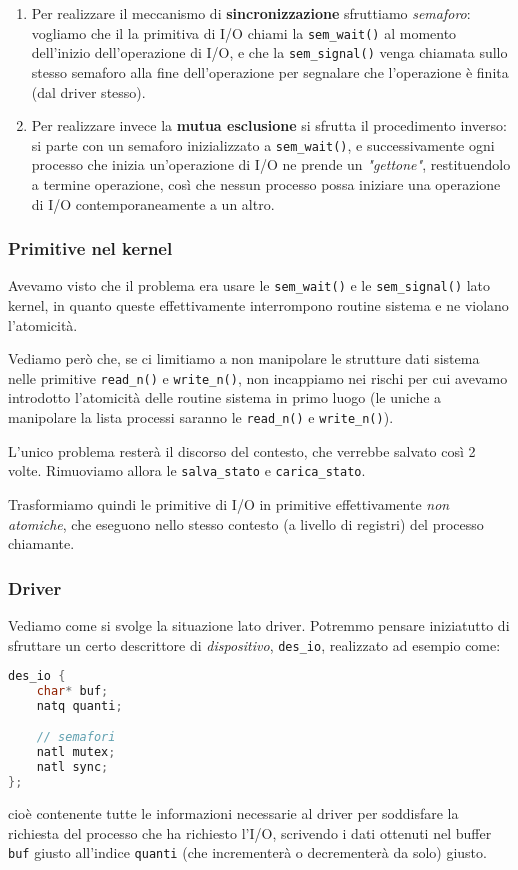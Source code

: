 \documentclass[a4paper,11pt]{article}
\begin{document}
\begin{enumerate}
	\item 
Per realizzare il meccanismo di \textbf{sincronizzazione} sfruttiamo \textit{semaforo}: vogliamo che il la primitiva di I/O chiami la \lstinline|sem_wait()| al momento dell'inizio dell'operazione di I/O, e che la \lstinline|sem_signal()| venga chiamata sullo stesso semaforo alla fine dell'operazione per segnalare che l'operazione è finita (dal driver stesso).

	\item
Per realizzare invece la \textbf{mutua esclusione} si sfrutta il procedimento inverso: si parte con un semaforo inizializzato a \lstinline|sem_wait()|, e successivamente ogni processo che inizia un'operazione di I/O ne prende un \textit{"gettone"}, restituendolo a termine operazione, così che nessun processo possa iniziare una operazione di I/O contemporaneamente a un altro.
\end{enumerate}

\subsubsection{Primitive nel kernel}
Avevamo visto che il problema era usare le \lstinline|sem_wait()| e le \lstinline|sem_signal()| lato kernel, in quanto queste effettivamente interrompono routine sistema e ne violano l'atomicità.

Vediamo però che, se ci limitiamo a non manipolare le strutture dati sistema nelle primitive \lstinline|read_n()| e \lstinline|write_n()|, non incappiamo nei rischi per cui avevamo introdotto l'atomicità delle routine sistema in primo luogo (le uniche a manipolare la lista processi saranno le \lstinline|read_n()| e \lstinline|write_n()|).

L'unico problema resterà il discorso del contesto, che verrebbe salvato così 2 volte.
Rimuoviamo allora le \lstinline|salva_stato| e \lstinline|carica_stato|.

Trasformiamo quindi le primitive di I/O in primitive effettivamente \textit{non atomiche}, che eseguono nello stesso contesto (a livello di registri) del processo chiamante.

\subsubsection{Driver}
Vediamo come si svolge la situazione lato driver.
Potremmo pensare iniziatutto di sfruttare un certo descrittore di \textit{dispositivo}, \lstinline|des_io|, realizzato ad esempio come:
\begin{lstlisting}[language=C++, style=codestyle]	
des_io {
	char* buf;
	natq quanti;

	// semafori
	natl mutex;
	natl sync;
};
\end{lstlisting}
cioè contenente tutte le informazioni necessarie al driver per soddisfare la richiesta del processo che ha richiesto l'I/O, scrivendo i dati ottenuti nel buffer \lstinline|buf| giusto all'indice \lstinline|quanti| (che incrementerà o decrementerà da solo) giusto.
\end{document}

